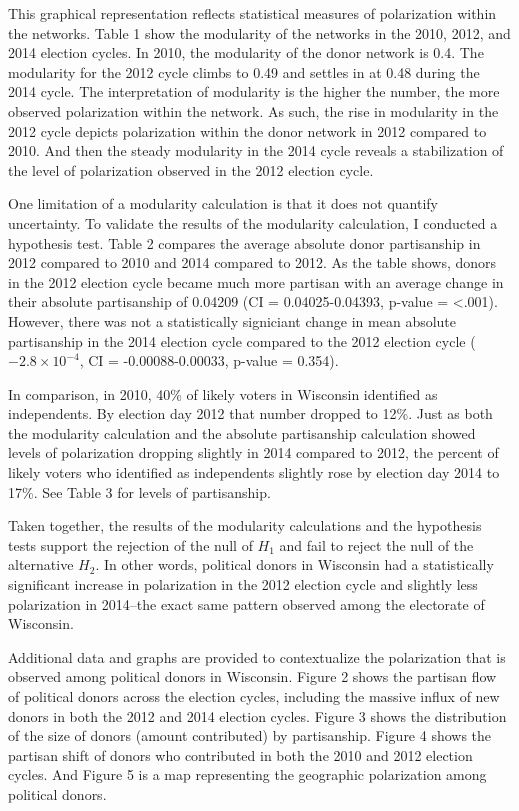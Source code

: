 \documentclass[12pt,]{article}
\begin{document}
This graphical representation reflects statistical measures of
polarization within the networks. Table 1 show the modularity of the
networks in the 2010, 2012, and 2014 election cycles. In 2010, the
modularity of the donor network is 0.4. The modularity for the 2012
cycle climbs to 0.49 and settles in at 0.48 during the 2014 cycle. The
interpretation of modularity is the higher the number, the more observed
polarization within the network. As such, the rise in modularity in the
2012 cycle depicts polarization within the donor network in 2012
compared to 2010. And then the steady modularity in the 2014 cycle
reveals a stabilization of the level of polarization observed in the
2012 election cycle.

One limitation of a modularity calculation is that it does not quantify
uncertainty. To validate the results of the modularity calculation, I
conducted a hypothesis test. Table 2 compares the average absolute donor
partisanship in 2012 compared to 2010 and 2014 compared to 2012. As the
table shows, donors in the 2012 election cycle became much more partisan
with an average change in their absolute partisanship of 0.04209 (CI =
0.04025-0.04393, p-value = \textless.001). However, there was not a
statistically signiciant change in mean absolute partisanship in the
2014 election cycle compared to the 2012 election cycle
(\ensuremath{-2.8\times 10^{-4}}, CI = -0.00088-0.00033, p-value =
0.354).

In comparison, in 2010, 40\% of likely voters in Wisconsin identified as
independents. By election day 2012 that number dropped to 12\%. Just as
both the modularity calculation and the absolute partisanship
calculation showed levels of polarization dropping slightly in 2014
compared to 2012, the percent of likely voters who identified as
independents slightly rose by election day 2014 to 17\%. See Table 3 for
levels of partisanship.

Taken together, the results of the modularity calculations and the
hypothesis tests support the rejection of the null of \(H_{1}\) and fail
to reject the null of the alternative \(H_{2}\). In other words,
political donors in Wisconsin had a statistically significant increase
in polarization in the 2012 election cycle and slightly less
polarization in 2014--the exact same pattern observed among the
electorate of Wisconsin.

Additional data and graphs are provided to contextualize the
polarization that is observed among political donors in Wisconsin.
Figure 2 shows the partisan flow of political donors across the election
cycles, including the massive influx of new donors in both the 2012 and
2014 election cycles. Figure 3 shows the distribution of the size of
donors (amount contributed) by partisanship. Figure 4 shows the partisan
shift of donors who contributed in both the 2010 and 2012 election
cycles. And Figure 5 is a map representing the geographic polarization
among political donors.
\end{document}
